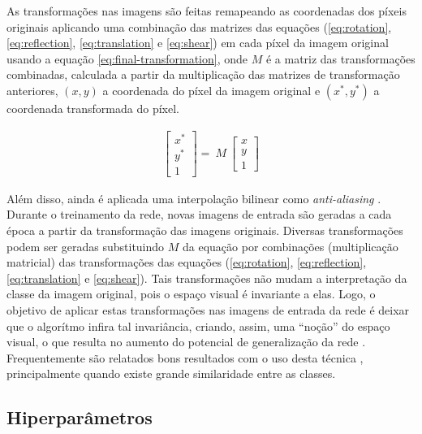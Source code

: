 \documentclass[a4,12pt]{horizon-theme}
\begin{document}
As transformações nas imagens são feitas remapeando as coordenadas dos píxeis originais aplicando uma combinação das matrizes das equações (\ref{eq:rotation}, \ref{eq:reflection}, \ref{eq:translation} e \ref{eq:shear}) em cada píxel da imagem original usando a equação \eqref{eq:final-transformation}, onde $M$ é a matriz das transformações combinadas, calculada a partir da multiplicação das matrizes de transformação anteriores, $(x, y)$ a coordenada do píxel da imagem original e $(x^*, y^*)$ a coordenada transformada do píxel.

\begin{align} \label{eq:final-transformation}
  \begin{bmatrix}
    x^* \\
    y^* \\
    1
  \end{bmatrix}
  =
  \ M\
  \begin{bmatrix}
    x \\
    y \\
    1
  \end{bmatrix}
\end{align}

Além disso, ainda é aplicada uma interpolação bilinear como \emph{anti-aliasing} \citep{aliasing, bilinear}. Durante o treinamento da rede, novas imagens de entrada são geradas a cada época a partir da transformação das imagens originais. Diversas transformações podem ser geradas substituindo $M$ da equação por combinações (multiplicação matricial) das transformações das equações (\ref{eq:rotation}, \ref{eq:reflection}, \ref{eq:translation} e \ref{eq:shear}). Tais transformações não mudam a interpretação da classe da imagem original, pois o espaço visual é invariante a elas. Logo, o objetivo de aplicar estas transformações nas imagens de entrada da rede é deixar que o algorítmo infira tal invariância, criando, assim, uma ``noção'' do espaço visual, o que resulta no aumento do potencial de generalização da rede \citep{Simard2003, CholletBook}. Frequentemente são relatados bons resultados com o uso desta técnica \citep{EfficientNetEx01, EfficientNetEx02, CNNEx04}, principalmente quando existe grande similaridade entre as classes.





\subsection{Hiperparâmetros}
\label{section:hyperparam}
\end{document}
